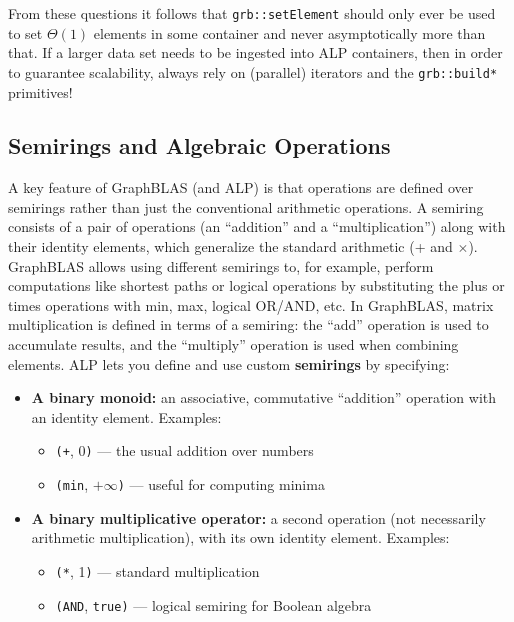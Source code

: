 From these questions it follows that \texttt{grb::setElement} should only ever be used to set $\Theta(1)$ elements in some container and never asymptotically more than that. If a larger data set needs to be ingested into ALP containers, then in order to guarantee scalability, always rely on (parallel) iterators and the \texttt{grb::build*} primitives!

\subsection{Semirings and Algebraic Operations}

A key feature of GraphBLAS (and ALP) is that operations are defined over semirings rather than just the conventional arithmetic operations. A semiring consists of a pair of operations (an “addition” and a “multiplication”) along with their identity elements, which generalize the standard arithmetic (+ and $\times$). GraphBLAS allows using different semirings to, for example, perform computations like shortest paths or logical operations by substituting the plus or times operations with min, max, logical OR/AND, etc. In GraphBLAS, matrix multiplication is defined in terms of a semiring: the “add” operation is used to accumulate results, and the “multiply” operation is used when combining elements.
ALP lets you define and use custom \textbf{semirings} by specifying:


\begin{itemize}
  \item \textbf{A binary monoid:} an associative, commutative ``addition'' operation with an identity element. Examples:
  \begin{itemize}
    \item \texttt{(+}, 0\texttt{)} — the usual addition over numbers
    \item \texttt{(min}, $+\infty$\texttt{)} — useful for computing minima
  \end{itemize}
  
  \item \textbf{A binary multiplicative operator:} a second operation (not necessarily arithmetic multiplication), with its own identity element. Examples:
  \begin{itemize}
    \item \texttt{(*}, 1\texttt{)} — standard multiplication
    \item \texttt{(AND}, \texttt{true}\texttt{)} — logical semiring for Boolean algebra
  \end{itemize}
\end{itemize}

